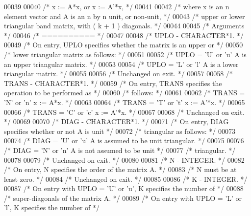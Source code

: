 \begin{DoxyCode}
00039 
00040 \textcolor{comment}{/*     x := A*x,   or   x := A'*x, */}
00041 
00042 \textcolor{comment}{/*  where x is an n element vector and  A is an n by n unit, or non-unit, */}
00043 \textcolor{comment}{/*  upper or lower triangular band matrix, with ( k + 1 ) diagonals. */}
00044 
00045 \textcolor{comment}{/*  Arguments */}
00046 \textcolor{comment}{/*  ========== */}
00047 
00048 \textcolor{comment}{/*  UPLO   - CHARACTER*1. */}
00049 \textcolor{comment}{/*           On entry, UPLO specifies whether the matrix is an upper or */}
00050 \textcolor{comment}{/*           lower triangular matrix as follows: */}
00051 
00052 \textcolor{comment}{/*              UPLO = 'U' or 'u'   A is an upper triangular matrix. */}
00053 
00054 \textcolor{comment}{/*              UPLO = 'L' or 'l'   A is a lower triangular matrix. */}
00055 
00056 \textcolor{comment}{/*           Unchanged on exit. */}
00057 
00058 \textcolor{comment}{/*  TRANS  - CHARACTER*1. */}
00059 \textcolor{comment}{/*           On entry, TRANS specifies the operation to be performed as */}
00060 \textcolor{comment}{/*           follows: */}
00061 
00062 \textcolor{comment}{/*              TRANS = 'N' or 'n'   x := A*x. */}
00063 
00064 \textcolor{comment}{/*              TRANS = 'T' or 't'   x := A'*x. */}
00065 
00066 \textcolor{comment}{/*              TRANS = 'C' or 'c'   x := A'*x. */}
00067 
00068 \textcolor{comment}{/*           Unchanged on exit. */}
00069 
00070 \textcolor{comment}{/*  DIAG   - CHARACTER*1. */}
00071 \textcolor{comment}{/*           On entry, DIAG specifies whether or not A is unit */}
00072 \textcolor{comment}{/*           triangular as follows: */}
00073 
00074 \textcolor{comment}{/*              DIAG = 'U' or 'u'   A is assumed to be unit triangular. */}
00075 
00076 \textcolor{comment}{/*              DIAG = 'N' or 'n'   A is not assumed to be unit */}
00077 \textcolor{comment}{/*                                  triangular. */}
00078 
00079 \textcolor{comment}{/*           Unchanged on exit. */}
00080 
00081 \textcolor{comment}{/*  N      - INTEGER. */}
00082 \textcolor{comment}{/*           On entry, N specifies the order of the matrix A. */}
00083 \textcolor{comment}{/*           N must be at least zero. */}
00084 \textcolor{comment}{/*           Unchanged on exit. */}
00085 
00086 \textcolor{comment}{/*  K      - INTEGER. */}
00087 \textcolor{comment}{/*           On entry with UPLO = 'U' or 'u', K specifies the number of */}
00088 \textcolor{comment}{/*           super-diagonals of the matrix A. */}
00089 \textcolor{comment}{/*           On entry with UPLO = 'L' or 'l', K specifies the number of */}

\end{DoxyCode}
